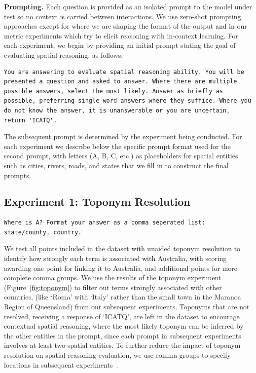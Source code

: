 \textbf{Prompting.} 
Each question is provided as an isolated prompt to the model under test so no context is carried between interactions.
We use zero-shot prompting approaches except for where we are shaping the format of the output and in our metric experiments which try to elicit reasoning with in-context learning. 
For each experiment, we begin by providing an initial prompt stating the goal of evaluating spatial reasoning, as follows:

\begin{lstlisting}[title=Prompt 1: Initial System Prompt]
    You are answering to evaluate spatial reasoning ability. You will be presented a question and asked to answer. Where there are multiple possible answers, select the most likely. Answer as briefly as possible, preferring single word answers where they suffice. Where you do not know the answer, it is unanswerable or you are uncertain, return 'ICATQ'.
\end{lstlisting}

\noindent The subsequent prompt is determined by the experiment being conducted.
For each experiment we describe below the specific prompt format used for the second prompt, with letters (A, B, C, etc.) as placeholders for spatial entities such as cities, rivers, roads, and states that we fill in to construct the final prompts.


\subsection{Experiment 1: Toponym Resolution}

\begin{lstlisting}[title=Prompt 2: Toponym Resolution Prompt]
    Where is A? Format your answer as a comma seperated list: state/county, country.
\end{lstlisting}

\noindent We test all points included in the dataset with unaided toponym resolution to identify how strongly each term is associated with Australia, with scoring awarding one point for linking it to Australia, and additional points for more complete comma groups.
We use the results of the toponym experiment (Figure~\ref{fig:toponym}) to filter out terms strongly associated with other countries, (like `Roma' with `Italy' rather than the small town in the Maranoa Region of Queensland) from our subsequent experiments. 
Toponyms that are not resolved, receiving a response of `ICATQ', are left in the dataset to encourage contextual spatial reasoning, where the most likely toponym can be inferred by the other entities in the prompt, since each prompt in subsequent experiments involves at least two spatial entities.
To further reduce the impact of toponym resolution on spatial reasoning evaluation, we use comma groups to specify locations in subsequent experiments~\cite{Lieberman2010}.

